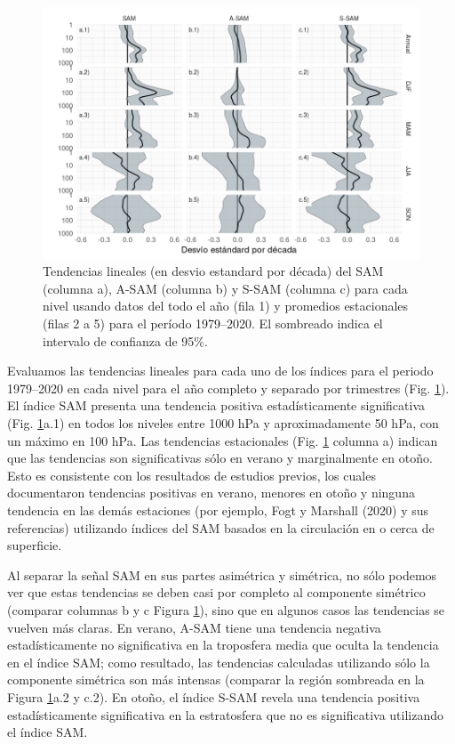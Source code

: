 \documentclass[12pt,oneside,a4paper]{reedthesis}
\begin{document}
\begin{figure}

{\centering \includegraphics{figures/30-sam/trends-1} 

}

\caption{Tendencias lineales (en desvio estandard por década) del SAM (columna a), A-SAM (columna b) y S-SAM (columna c) para cada nivel usando datos del todo el año (fila 1) y promedios estacionales (filas 2 a 5) para el período 1979--2020. El sombreado indica el intervalo de confianza de 95\%.}\label{fig:trends}
\end{figure}

Evaluamos las tendencias lineales para cada uno de los índices para el periodo 1979--2020 en cada nivel para el año completo y separado por trimestres (Fig. \ref{fig:trends}).
El índice SAM presenta una tendencia positiva estadísticamente significativa (Fig. \ref{fig:trends}a.1) en todos los niveles entre 1000 hPa y aproximadamente 50 hPa, con un máximo en 100 hPa.
Las tendencias estacionales (Fig. \ref{fig:trends} columna a) indican que las tendencias son significativas sólo en verano y marginalmente en otoño.
Esto es consistente con los resultados de estudios previos, los cuales documentaron tendencias positivas en verano, menores en otoño y ninguna tendencia en las demás estaciones (por ejemplo, Fogt y Marshall (2020) y sus referencias) utilizando índices del SAM basados en la circulación en o cerca de superficie.

Al separar la señal SAM en sus partes asimétrica y simétrica, no sólo podemos ver que estas tendencias se deben casi por completo al componente simétrico (comparar columnas b y c Figura \ref{fig:trends}), sino que en algunos casos las tendencias se vuelven más claras.
En verano, A-SAM tiene una tendencia negativa estadísticamente no significativa en la troposfera media que oculta la tendencia en el índice SAM; como resultado, las tendencias calculadas utilizando sólo la componente simétrica son más intensas (comparar la región sombreada en la Figura \ref{fig:trends}a.2 y c.2).
En otoño, el índice S-SAM revela una tendencia positiva estadísticamente significativa en la estratosfera que no es significativa utilizando el índice SAM.
\end{document}
